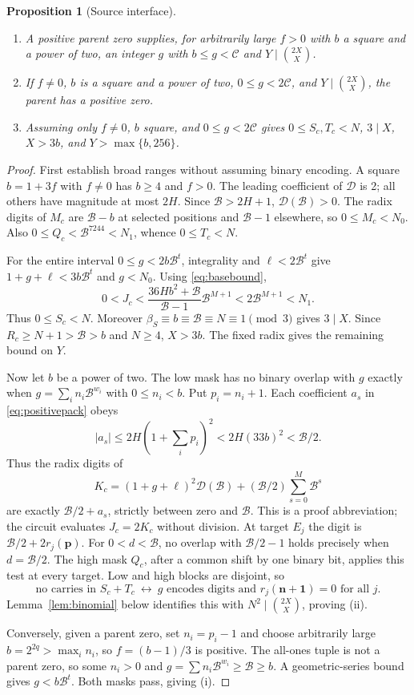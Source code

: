 \documentclass[11pt,letterpaper]{article}
\newtheorem{proposition}[theorem]{Proposition}
\theoremstyle{remark}\newtheorem{remark}[theorem]{Remark}
\begin{document}
\begin{proposition}[Source interface]\label{prop:source}
\begin{enumerate}[label=(\roman*)]
\item A positive parent zero supplies, for arbitrarily large $f>0$
with $b$ a square and a power of two, an integer $g$ with
$b\le g<\mathscr C$ and $Y\mid\binom{2X}{X}$.
\item If $f\ne0$, $b$ is a square and a power of two,
$0\le g<2\mathscr C$, and $Y\mid\binom{2X}{X}$, the parent has a positive zero.
\item Assuming only $f\ne0$, $b$ square, and $0\le g<2\mathscr C$ gives
$0\le S_c,T_c<N$, $3\mid X$, $X>3b$, and $Y>\max\{b,256\}$.
\end{enumerate}
\end{proposition}
\begin{proof}
First establish broad ranges without assuming binary encoding. A square
$b=1+3f$ with $f\ne0$ has $b\ge4$ and $f>0$.
The leading coefficient of $\mathcal D$ is 2; all others have magnitude
at most $2H$. Since $\mathcal B>2H+1$, $\mathcal D(\mathcal B)>0$.
The radix digits of $M_c$ are $\mathcal B-b$ at selected positions and
$\mathcal B-1$ elsewhere, so $0\le M_c<N_0$. Also
$0\le Q_c<\mathcal B^{7244}<N_1$, whence $0\le T_c<N$.

For the entire interval $0\le g<2b\mathcal B^t$, integrality and
$\ell<2\mathcal B^t$ give $1+g+\ell<3b\mathcal B^t$ and $g<N_0$.
Using \eqref{eq:basebound},
\[
0<J_c<\frac{36Hb^2+\mathcal B}{\mathcal B-1}\mathcal B^{M+1}
<2\mathcal B^{M+1}<N_1.
\]
Thus $0\le S_c<N$. Moreover
$\beta_S\equiv b\equiv\mathcal B\equiv N\equiv1\pmod3$ gives $3\mid X$.
Since $R_c\ge N+1>\mathcal B>b$ and $N\ge4$, $X>3b$.
The fixed radix gives the remaining bound on $Y$.

Now let $b$ be a power of two. The low mask has no binary overlap with
$g$ exactly when $g=\sum_i n_i\mathcal B^{w_i}$ with $0\le n_i<b$.
Put $p_i=n_i+1$. Each coefficient $a_s$ in \eqref{eq:positivepack} obeys
\[
|a_s|\le2H(1+\textstyle\sum_i p_i)^2<2H(33b)^2<\mathcal B/2.
\]
Thus the radix digits of
\[
K_c=(1+g+\ell)^2\mathcal D(\mathcal B)
+(\mathcal B/2)\sum_{s=0}^M\mathcal B^s
\]
are exactly $\mathcal B/2+a_s$, strictly between zero and $\mathcal B$.
This is a proof abbreviation; the circuit evaluates $J_c=2K_c$ without
division. At target $E_j$ the digit is $\mathcal B/2+2r_j(\mathbf p)$.
For $0<d<\mathcal B$, no overlap with $\mathcal B/2-1$ holds precisely
when $d=\mathcal B/2$. The high mask $Q_c$, after a common shift by one
binary bit, applies this test at every target. Low and high blocks are
disjoint, so
\[
\text{no carries in }S_c+T_c
\ \longleftrightarrow\
g\text{ encodes digits and }r_j(\mathbf n+\mathbf1)=0\text{ for all }j.
\]
Lemma~\ref{lem:binomial} below identifies this with
$N^2\mid\binom{2X}{X}$, proving (ii).

Conversely, given a parent zero, set $n_i=p_i-1$ and choose arbitrarily
large $b=2^{2q}>\max_i n_i$, so $f=(b-1)/3$ is positive.
The all-ones tuple is not a parent zero, so some $n_i>0$ and
$g=\sum n_i\mathcal B^{w_i}\ge\mathcal B\ge b$.
A geometric-series bound gives $g<b\mathcal B^t$. Both masks pass,
giving (i).
\end{proof}
\end{document}
